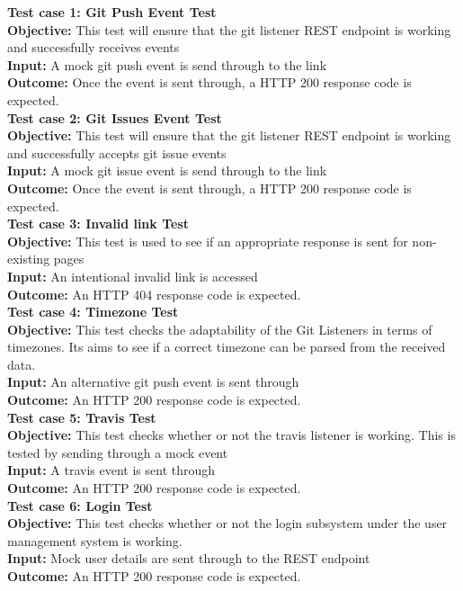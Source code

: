 \documentclass[11pt,a4paper]{article}
\begin{document}
\textbf{Test case 1: Git Push Event Test} \\
\textbf{Objective: } This test will ensure that the git listener REST endpoint is working and successfully receives events \\
\textbf{Input: } A mock git push event is send through to the link \\
\textbf{Outcome: } Once the event is sent through, a HTTP 200 response code is expected. \\

\textbf{Test case 2: Git Issues Event Test} \\
\textbf{Objective: } This test will ensure that the git listener REST endpoint is working and successfully accepts git issue events \\
\textbf{Input: } A mock git issue event is send through to the link \\
\textbf{Outcome: } Once the event is sent through, a HTTP 200 response code is expected. \\

\textbf{Test case 3: Invalid link Test} \\
\textbf{Objective: } This test is used to see if an appropriate response is sent for non-existing pages \\
\textbf{Input: } An intentional invalid link is accessed \\
\textbf{Outcome: } An HTTP 404 response code is expected. \\

\textbf{Test case 4: Timezone Test}  \\
\textbf{Objective: } This test checks the  adaptability of the Git Listeners in terms of timezones. Its aims to see if a correct timezone can be parsed from the received data. \\
\textbf{Input: } An alternative git push event is sent through \\
\textbf{Outcome: } An HTTP 200 response code is expected. \\

\textbf{Test case 5: Travis Test}  \\
\textbf{Objective: } This test checks whether or not the travis listener is working. This is tested by sending through a mock event \\
\textbf{Input: } A travis event is sent through \\
\textbf{Outcome: } An HTTP 200 response code is expected. \\

\textbf{Test case 6: Login Test}  \\
\textbf{Objective: } This test checks whether or not the login subsystem under the user management system is working.\\
\textbf{Input: } Mock user details are sent through to the REST endpoint \\
\textbf{Outcome: } An HTTP 200 response code is expected. \\
\end{document}
